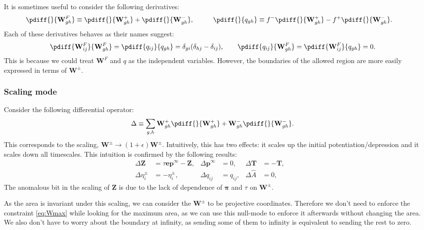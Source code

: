 \documentclass[12pt]{article}
\newcommand{\onev}{\mathbf{e}}
\newcommand{\eq}{\mathbf{p}^\infty}
\newcommand{\fpt}{\mathbf{T}}
\newcommand{\fund}{\mathbf{Z}}
\newcommand{\pib}{\boldsymbol{\pi}}
\newcommand{\W}{\mathbf{W}}
\begin{document}
It is sometimes useful to consider the following derivatives:
%
\begin{equation}\label{eq:derivqw}
  \begin{aligned}
    \pdiff{}{\W^F_{gh}} &\equiv     \pdiff{}{\W^+_{gh}} +     \pdiff{}{\W^-_{gh}} ,&\qquad
    \pdiff{}{q_{gh}}    &\equiv f^- \pdiff{}{\W^+_{gh}} - f^+ \pdiff{}{\W^-_{gh}} .
  \end{aligned}
\end{equation}
%
Each of these derivatives behaves as their names suggest:
%
\begin{equation}\label{eq:derivqweff}
  \pdiff{\W^F_{ij}}{\W^F_{gh}} = \pdiff{q_{ij}}{q_{gh}}
  =  \delta_{gi}(\delta_{hj}-\delta_{ij}),
  \qquad
  \pdiff{q_{ij}}{\W^F_{gh}} = \pdiff{\W^F_{ij}}{q_{gh}}  = 0.
\end{equation}
%
This is because we could treat $\W^F$ and $q$ as the independent variables. However, the boundaries of the allowed region are more easily expressed in terms of $\W^\pm$.


\subsubsection{Scaling mode}\label{sec:rescale}

Consider the following differential operator:
%
\begin{equation}\label{eq:scaleop}
  \Delta \equiv \sum_{g,h} \W^+_{gh}\pdiff{}{\W^+_{gh}} + \W^-_{gh}\pdiff{}{\W^-_{gh}}.
\end{equation}
%
This corresponds to the scaling, $\W^\pm \to (1+\epsilon)\W^\pm$.
Intuitively, this has two effects: it scales up the initial potentiation/depression and it scales down all timescales.
This intuition is confirmed by the following results:
%
\begin{equation}\label{eq:scaleeffects}
  \begin{aligned}
    \Delta \fund &= \tau\onev\eq - \fund ,&
    \Delta \eq  &= 0 ,&
    \Delta \fpt  &= -\fpt ,
    \\
    \Delta \eta^\pm_i  &= - \eta^\pm_i ,&
    \Delta q_{ij} &= q_{ij} ,&
    \Delta \hat{A}  &= 0 ,&
  \end{aligned}
\end{equation}
%
The anomalous bit in the scaling of $\fund$ is due to the lack of dependence of $\pib$ and $\tau$ on $\W^\pm$.

As the area is invariant under this scaling, we can consider the $\W^\pm$ to be projective coordinates.
Therefore we don't need to enforce the constraint \eqref{eq:Wmax} while looking for the maximum area, as we can use this null-mode to enforce it afterwards without changing the area.
We also don't have to worry about the boundary at infinity,
as sending some of them to infinity is equivalent to sending the rest to zero.
\end{document}
